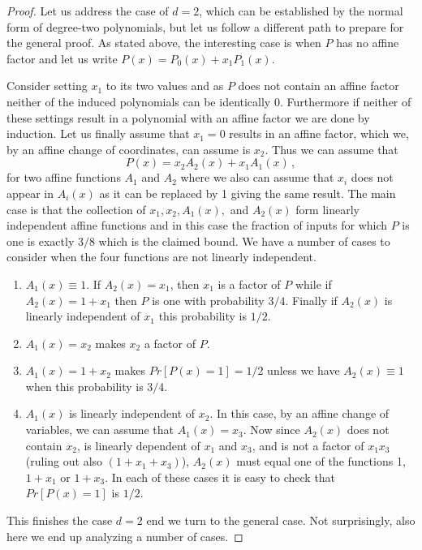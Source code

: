 \begin{proof}
Let us address the case of $d=2$, which can
be established by the normal form of 
%
degree-two 
polynomials, but let us follow a
different path to prepare for the general proof.
As stated above, the interesting case is
when $P$ has no affine factor and let
us write $P(x)=P_0(x)+x_1P_1(x)$.

Consider setting $x_1$ to its two values and as
$P$ does not contain an affine factor neither
of the induced polynomials can be identically 0.  Furthermore
if neither of these settings result in a polynomial
with an affine factor we are done by
induction.  Let us finally assume that $x_1=0$
results in an affine factor, which we, by an
affine change of coordinates, can assume is $x_2$.
Thus we can assume that 
$$
P(x)= x_2 A_2(x)+x_1A_1(x)\,,
$$
for two affine functions $A_1$ and $A_2$ where
we also can assume that $x_i$ does not appear in $A_i(x)$ as it
can be replaced by 1 giving the same result.
The main case is that the collection of $x_1,x_2, A_1(x),$
and $A_2(x)$ form linearly independent affine functions and
in this case the fraction of inputs for which
$P$ is one is exactly $3/8$ which is the claimed bound.
We have a number of cases to consider when the four
functions are not linearly independent.

\begin{enumerate}
\item $A_1(x) \equiv 1$.  If $A_2(x)=x_1$, then $x_1$ is a factor
of $P$ while if $A_2(x)=1+x_1$ then $P$ is one with
probability $3/4$. Finally if $A_2(x)$ is linearly independent
of $x_1$ this probability is $1/2$.  

\item $A_1(x)=x_2$ makes $x_2$ a factor of $P$.

\item $A_1(x)=1+x_2$ makes $Pr[P(x)=1]=1/2$ unless we
have $A_2(x) \equiv 1$ when this probability is $3/4$.

\item $A_1(x)$ is linearly independent of $x_2$.  In this case,
by an affine change of variables, we can assume that $A_1(x)=x_3$.
Now since $A_2(x)$ does not contain $x_2$, is linearly
dependent of $x_1$ and $x_3$, and is not a factor
of $x_1x_3$ (ruling out also $(1+x_1+x_3)$), 
$A_2(x)$ must equal one of the functions 1, $1+x_1$
or $1+x_3$.  In each of these cases it is easy
to check that $Pr[P(x)=1]$ is $1/2$.

\end{enumerate}
This finishes the case $d=2$ end we turn to the
general case.  Not surprisingly, also here we
end up analyzing a number of cases.


\end{proof}
